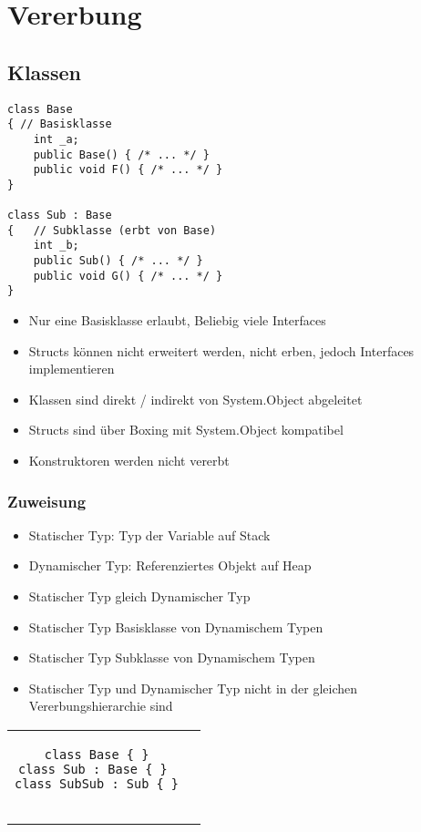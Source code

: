 
\section{Vererbung}

\begin{multicols*}{2}

\subsection{Klassen}
\begin{lstlisting}
class Base
{ // Basisklasse
    int _a;
    public Base() { /* ... */ }
    public void F() { /* ... */ }
}

class Sub : Base
{   // Subklasse (erbt von Base)
    int _b;
    public Sub() { /* ... */ }
    public void G() { /* ... */ }
}
\end{lstlisting}
\begin{itemize}
    \item Nur eine Basisklasse erlaubt, Beliebig viele Interfaces
    \item Structs können nicht erweitert werden, nicht erben, jedoch Interfaces implementieren
    \item Klassen sind direkt / indirekt von System.Object abgeleitet
    \item Structs sind über Boxing mit System.Object kompatibel
    \item Konstruktoren werden nicht vererbt
\end{itemize}
\subsubsection{Zuweisung}
\begin{itemize}
    \item Statischer Typ: Typ der Variable auf Stack
    \item Dynamischer Typ: Referenziertes Objekt auf Heap
\end{itemize}
\begin{itemize}
    \item Statischer Typ gleich Dynamischer Typ
    \item Statischer Typ Basisklasse von Dynamischem Typen
\end{itemize}
\begin{itemize}
    \item Statischer Typ Subklasse von Dynamischem Typen
    \item Statischer Typ und Dynamischer Typ nicht in der gleichen Vererbungshierarchie sind
\end{itemize}
\begin{tabular}[h!]{ | c | c | }
\hline 
\begin{lstlisting}[frame=n]
class Base { }
class Sub : Base { } 
class SubSub : Sub { }


\end{lstlisting}
\end{tabular}
\end{multicols*}
